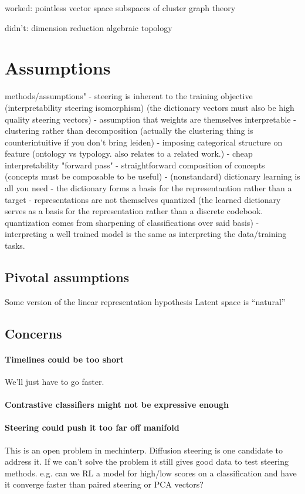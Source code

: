 worked:
pointless vector space
subspaces of cluster
graph theory

didn't:
dimension reduction 
algebraic 
topology

\section{Assumptions}

methods/assumptions"
- steering is inherent to the training objective  (interpretability steering isomorphism) (the dictionary vectors must also be high quality steering vectors)
- assumption that weights are themselves interpretable
- clustering rather than decomposition (actually the clustering thing is counterintuitive if you don't bring leiden)
- imposing categorical structure on feature (ontology vs typology. also relates to a related work.)
- cheap interpretability "forward pass"
- straightforward composition of concepts (concepts must be composable to be useful)
- (nonstandard) dictionary learning is all you need 
- the dictionary forms a basis for the representantion rather than a target
- representations are not themselves quantized (the learned dictionary serves as a basis for the representation rather than a discrete codebook. quantization comes from sharpening of classifications over said basis)
- interpreting a well trained model is the same as interpreting the data/training tasks.

\subsection{Pivotal assumptions}
Some version of the linear representation hypothesis
Latent space is ``natural''

\subsection{Concerns}

\paragraph{Timelines could be too short}
We'll just have to go faster.

\paragraph{Contrastive classifiers might not be expressive enough}

\paragraph{Steering could push it too far off manifold}
This is an open problem in mechinterp. Diffusion steering is one candidate to address it\cite{wagenmaker2025}.
If we can't solve the problem it still gives good data to test steering methods. e.g. can we RL a model for high/low scores on a classification and have it converge faster than paired steering or PCA vectors?

